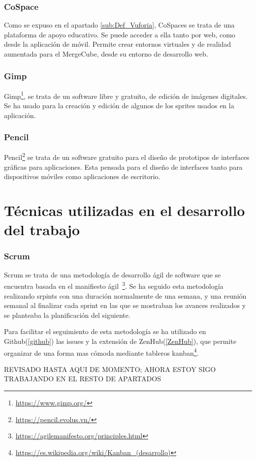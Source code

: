\subsubsection{CoSpace}
Como se expuso en el apartado \ref{sub:Def_Vuforia}, CoSpaces se trata de una plataforma de apoyo educativo. Se puede acceder a ella tanto por web, como desde la aplicación de móvil. Permite crear entornos virtuales y de realidad aumentada para el MergeCube, desde su entorno de desarrollo web.

\subsubsection{Gimp}
Gimp\footnote{\url{https://www.gimp.org/}}, se trata de un software libre y gratuito, de edición de imágenes digitales. Se ha usado para la creación y edición de algunos de los sprites usados en la aplicación.

\subsubsection{Pencil}
Pencil\footnote{\url{https://pencil.evolus.vn/}} se trata de un software gratuito para el diseño de prototipos de interfaces gráficas para aplicaciones. Esta pensada para el diseño de interfaces tanto para dispositivos móviles como aplicaciones de escritorio.

\section{Técnicas utilizadas en el desarrollo del trabajo}
\subsubsection{Scrum}
Scrum se trata de una metodología de desarrollo ágil de software que se encuentra basada en el manifiesto ágil~\footnote{\url{https://agilemanifesto.org/principles.html}}. Se ha seguido esta metodología realizando srpints con una duración normalmente de una semana, y una reunión semanal al finalizar cada sprint en las que se mostraban los avances realizados y se planteaba la planificación del siguiente.

Para facilitar el seguimiento de esta metodología se ha utilizado en Github(\ref{github}) las issues y la extensión de ZenHub(\ref{ZenHub}), que permite organizar de una forma mas cómoda mediante tableros kanban\footnote{\url{https://es.wikipedia.org/wiki/Kanban_(desarrollo)}}.


REVISADO HASTA AQUI DE MOMENTO; AHORA ESTOY SIGO TRABAJANDO EN EL RESTO DE APARTADOS

